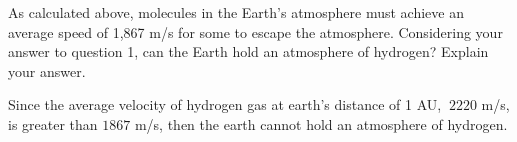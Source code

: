 \documentclass[../astro_4]{subfiles}
\begin{document}
  \begin{problem}
As calculated above, molecules in the Earth's atmosphere must achieve an average speed of 1,867 m/s for some to escape the atmosphere. Considering your answer to question 1, can the Earth hold an atmosphere of hydrogen? 
Explain your answer.   
  \end{problem}
Since the average velocity of hydrogen gas at earth's distance of 1 AU, $~2220$ m/s, 
is greater than $1867$ m/s, then the earth cannot hold an atmosphere of hydrogen. 
\end{document}

